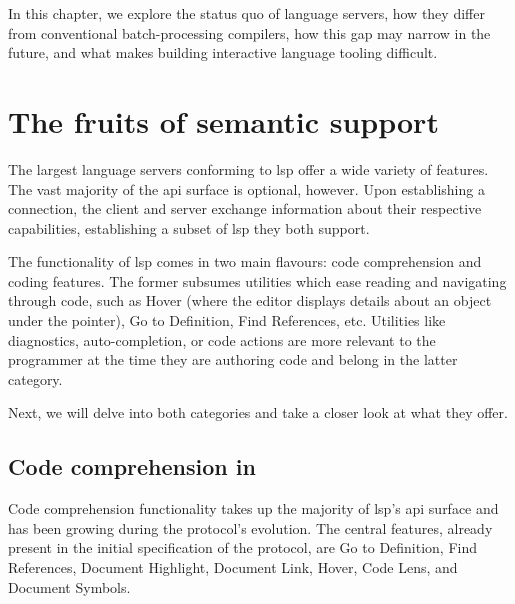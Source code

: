 In this chapter, we explore the status quo of language servers, how they differ
from conventional batch-processing compilers, how this gap may narrow in the
future, and what makes building interactive language tooling difficult.

\section{The fruits of semantic support}


The largest language servers conforming to \acrshort{lsp} offer a wide variety
of features. The vast majority of the \acrshort{api} surface is optional,
however. Upon establishing a connection, the client and server exchange
information about their respective capabilities, establishing a subset of
\acrshort{lsp} they both support.

The functionality of \acrshort{lsp} comes in two main flavours: code
comprehension and coding features. The former subsumes utilities which ease
reading and navigating through code, such as Hover (where the editor displays
details about an object under the pointer), Go to Definition, Find References,
etc. Utilities like diagnostics, auto-completion, or code actions are more
relevant to the programmer at the time they are authoring code and belong in the
latter category.

Next, we will delve into both categories and take a closer look at what they
offer.


\subsection{Code comprehension in }


\newcommand{\org}{\pdftooltip{(original)}{This request was present in the
original LSP specification.}}

Code comprehension functionality takes up the majority of \acrshort{lsp}'s
\acrshort{api} surface and has been growing during the protocol's evolution. The
central features, already present in the initial specification of the protocol,
are Go to Definition, Find References, Document Highlight, Document Link, Hover,
Code Lens, and Document Symbols.


